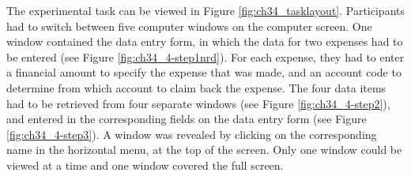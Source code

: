 \begin{table}
\begin{itemize}
The experimental task can be viewed in Figure \ref{fig:ch34_tasklayout}. Participants had to switch between five computer windows on the computer screen. One window contained the data entry form, in which the data for two expenses had to be entered (see Figure \ref{fig:ch34_4-step1nrd}). For each expense, they had to enter a financial amount to specify the expense that was made, and an account code to determine from which account to claim back the expense. 
The four data items had to be retrieved from four separate windows (see Figure \ref{fig:ch34_4-step2}), and entered in the corresponding fields on the data entry form (see Figure \ref{fig:ch34_4-step3}). A window was revealed by clicking on the corresponding name in the horizontal menu, at the top of the screen. Only one window could be viewed at a time and one window covered the full screen. 


\end{itemize}
\end{table}
